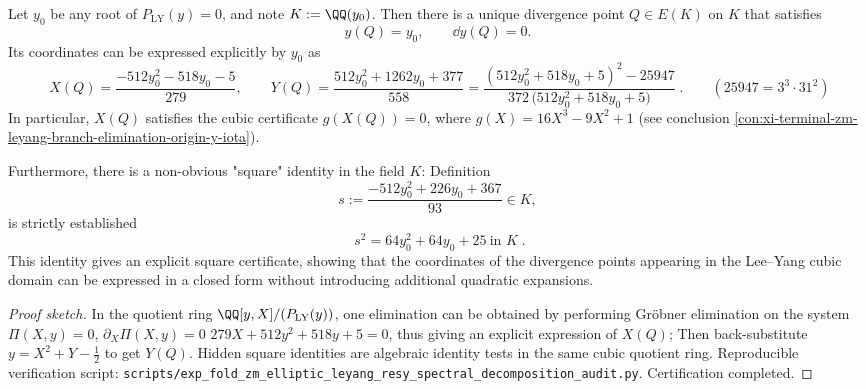\begin{conclusion}\label{con:xi-terminal-zm-leyang-branchpoint-explicit-coordinates-hidden-square}
Let \(y_0\) be any root of \(P_{\mathrm{LY}}(y)=0\), and note \(K:=\QQ(y_0)\).
Then there is a unique divergence point \(Q\in E(K)\) on \(K\) that satisfies
\[
y(Q)=y_0,\qquad \dd y(Q)=0.
\]
Its coordinates can be expressed explicitly by \(y_0\) as
\[
\boxed{\;
X(Q)=\frac{-512y_0^{2}-518y_0-5}{279},\qquad
Y(Q)=\frac{512y_0^{2}+1262y_0+377}{558}
=\frac{(512y_0^{2}+518y_0+5)^{2}-25947}{372\,\bigl(512y_0^{2}+518y_0+5\bigr)}\; }.
\qquad (25947=3^{3}\cdot 31^{2})
\]
In particular, \(X(Q)\) satisfies the cubic certificate \(g(X(Q))=0\), where \(g(X)=16X^{3}-9X^{2}+1\) (see conclusion \ref{con:xi-terminal-zm-leyang-branch-elimination-origin-y-iota}).
\par
Furthermore, there is a non-obvious "square" identity in the field \(K\): Definition
\[
s:=\frac{-512y_0^{2}+226y_0+367}{93}\in K,
\]
is strictly established
\[
\boxed{\;s^{2}=64y_0^{2}+64y_0+25\ \text{in }K\text{}\; }.
\]
This identity gives an explicit square certificate, showing that the coordinates of the divergence points appearing in the Lee--Yang cubic domain can be expressed in a closed form without introducing additional quadratic expansions.
\end{conclusion}
\begin{proof}[Proof sketch]
In the quotient ring \(\QQ[y,X]/(P_{\mathrm{LY}}(y))\), one elimination can be obtained by performing Gröbner elimination on the system \(\Pi(X,y)=0\), \(\partial_{X}\Pi(X,y)=0\)
\(
279X+512y^{2}+518y+5=0
\), thus giving an explicit expression of \(X(Q)\);
Then back-substitute \(y=X^{2}+Y-\tfrac12\) to get \(Y(Q)\).
Hidden square identities are algebraic identity tests in the same cubic quotient ring.
Reproducible verification script: \texttt{scripts/exp\_fold\_zm\_elliptic\_leyang\_resy\_spectral\_decomposition\_audit.py}. Certification completed.
\end{proof}

